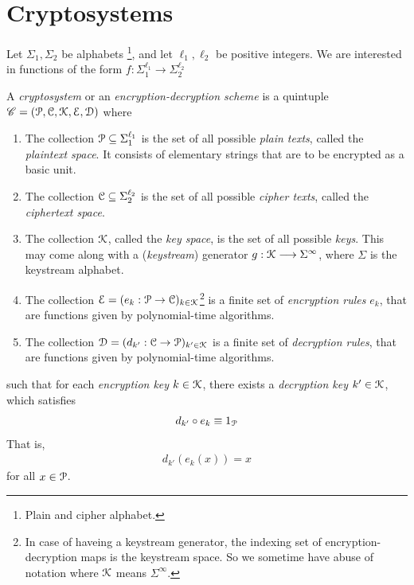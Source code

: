 \documentclass[a4paper, 12pt]{book} %
\begin{document}
\section{Cryptosystems}

Let $\Sigma_1, \Sigma_2$ be alphabets \footnote{Plain and cipher alphabet.}, and let $\ell_1, \ell_2$ be positive integers. We are interested in functions of the form $f: \Sigma_1^{\ell_1} \longrightarrow \Sigma_2^{\ell_2}$

\begin{definition}
    A \emph{cryptosystem} or an \emph{encryption-decryption scheme} is a quintuple $\mathscr{C} = (\EuScript{P}, \EuScript{C}, \EuScript{K}, \EuScript{E}, \EuScript{D})$ where 
    \begin{enumerate}
        \item The collection $\EuScript{P} \subseteq \Sigma_1^{\ell_1}$ is the set of all possible \emph{plain texts}, called the \emph{plaintext space}. It consists of elementary strings that are to be encrypted as a basic unit.
        \item The collection $\EuScript{C}  \subseteq \Sigma_2^{\ell_2}$ is the set of all possible \emph{cipher texts}, called the \emph{ciphertext space}.
        \item The collection $\EuScript{K}$, called the \emph{key space}, is the set of all possible \emph{keys}. This may come along with a (\emph{keystream}) generator $g: \EuScript{K} \longrightarrow \Sigma^\infty$, where $\Sigma$ is the keystream alphabet.
        \item The collection $\EuScript{E} = (e_k: \EuScript{P} \rightarrow \EuScript{C})_{k \in \EuScript{K}}$\footnote{In case of haveing a keystream generator, the indexing set of encryption-decryption maps is the keystream space. So we sometime have abuse of notation where $\EuScript{K}$ means $\Sigma^{\infty}$.} is a finite set of \emph{encryption rules} $e_k$, that are functions given by polynomial-time algorithms.
        \item The collection $\EuScript{D} = (d_{k'}: \EuScript{C} \rightarrow \EuScript{P} )_{k' \in \EuScript{K}}$ is a finite set of \emph{decryption rules}, that are functions given by polynomial-time algorithms.
    \end{enumerate}
    such that for each \emph{encryption key} $k \in \EuScript{K}$, there exists a \emph{decryption key} $k' \in \EuScript{K}$, which satisfies
    \begin{align}
        d_{k'} \circ e_k \equiv 1_{\EuScript{P}}
    \end{align}
    That is, 
    \begin{align}
        d_{k'}(e_k(x)) = x
    \end{align}
    for all $x \in \EuScript{P}$.
\end{definition}
\end{document}
